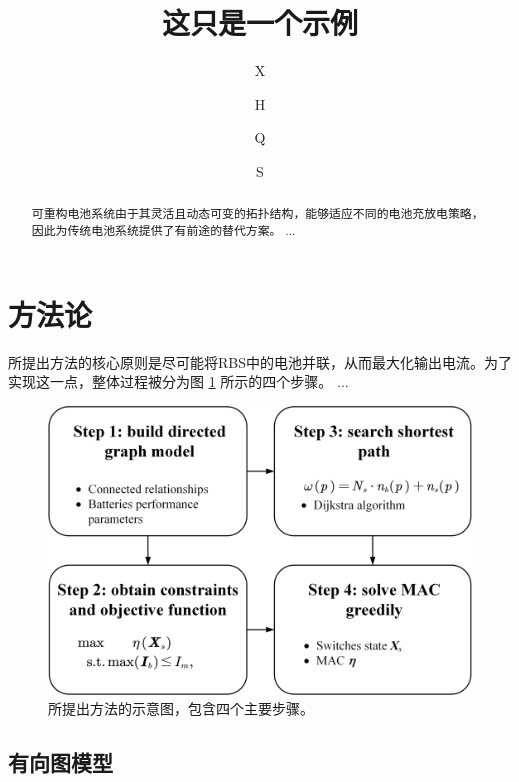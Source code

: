 \documentclass[a4paper,UTF8]{ctexart}
\title{这只是一个示例}
\author[1$\dag$]{X}
\author[1$\dag$]{H}
\author[1*]{Q}
\author[1,2]{S}
\affil[1]{R学院，中国}
\affil[2]{A学院，中国}
\affil[*]{通讯作者邮箱}
\affil[$\dag$]{这些作者对本文贡献相同。}
\begin{document}
\maketitle

\begin{abstract}
可重构电池系统由于其灵活且动态可变的拓扑结构，能够适应不同的电池充放电策略，因此为传统电池系统提供了有前途的替代方案。
...
\end{abstract}

\section{方法论}

所提出方法的核心原则是尽可能将RBS中的电池并联，从而最大化输出电流。为了实现这一点，整体过程被分为图 \ref{fig:main} 所示的四个步骤。
...

\begin{figure}[htbp]
    \centering
    \includegraphics[width=0.8\linewidth]{main.png}
    \caption{
        所提出方法的示意图，包含四个主要步骤。
    }
    \label{fig:main}
\end{figure}

\subsection{有向图模型}
\end{document}
